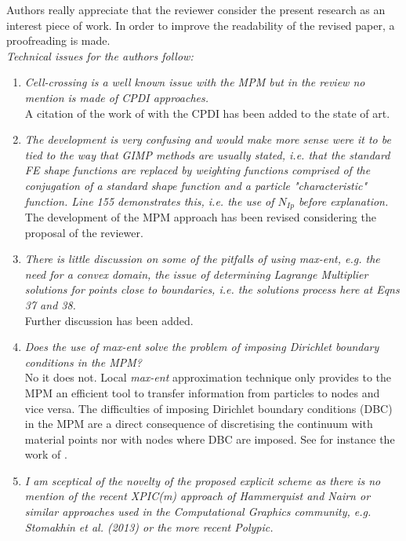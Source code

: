 \documentclass[12pt]{article}
\begin{document}
Authors really appreciate that the reviewer consider the present research as an interest piece of work. In order to improve the readability of the revised paper, a proofreading is made.\\

\textit{Technical issues for the authors follow:}
 \begin{enumerate}
\item \textit{Cell-crossing is a well known issue with the MPM but in the review no mention is made of CPDI approaches.}\\

A citation of the work of \cite{Sadeghirad_2011} with the CPDI has been added to the state of art.

\item \textit{The development is very confusing and would make more sense were it to be tied to 
the way that GIMP methods are usually stated, i.e. that the standard FE shape functions are replaced by weighting functions comprised of the conjugation of a standard shape function and a particle "characteristic" function. Line 155 demonstrates this, i.e. the use of $N_{Ip}$ before explanation.}\\

The development of the MPM approach has been revised considering the proposal of the reviewer. 

\item \textit{There is little discussion on some of the pitfalls of using max-ent, e.g. the need for a convex domain, the issue of determining Lagrange Multiplier solutions for points close to boundaries, i.e. the solutions process here at Eqns 37 and 38.}\\

Further discussion has been added. 

\item \textit{Does the use of max-ent solve the problem of imposing Dirichlet boundary conditions in the MPM?}\\

No it does not. Local \textit{max-ent} approximation technique only provides to the MPM an efficient tool to transfer information from particles to nodes and vice versa. The difficulties of imposing Dirichlet boundary conditions (DBC) in the MPM are a direct consequence of discretising the continuum with material points nor with nodes where DBC are imposed. See for instance the work of \cite{Cortis_et_al_2017_IJNME}.

\item \textit{I am sceptical of the novelty of the proposed explicit scheme as there is no mention of the recent XPIC(m) approach of Hammerquist and Nairn or similar approaches used in the Computational Graphics community, e.g. Stomakhin et al. (2013) or the more recent Polypic.}\\


\end{enumerate}
\end{document}
